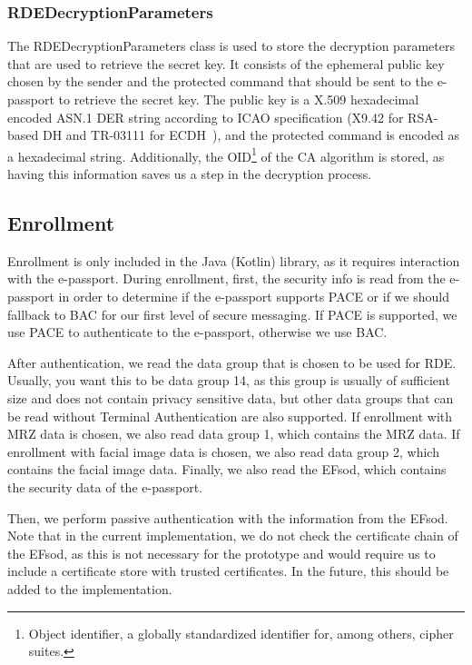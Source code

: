 \subsubsection{\textsf{RDEDecryptionParameters}}\label{subsubsec:rde-decryption-parameters}
The \textsf{RDEDecryptionParameters} class is used to store the decryption parameters that are used to retrieve the secret key.
It consists of the ephemeral public key chosen by the sender and the protected command that should be sent to the e-passport to retrieve the secret key.
The public key is a X.509 hexadecimal encoded ASN.1 DER string according to ICAO specification (X9.42 for RSA-based DH and TR-03111 for ECDH~\cite{icao9303securitymechanisms}), and the protected command is encoded as a hexadecimal string.
Additionally, the OID\footnote{Object identifier, a globally standardized identifier for, among others, cipher suites.} of the CA algorithm is stored, as having this information saves us a step in the decryption process.

\subsection{Enrollment}\label{subsec:enrollment}
Enrollment is only included in the Java (Kotlin) library, as it requires interaction with the e-passport.
During enrollment, first, the security info is read from the e-passport in order to determine if the e-passport supports PACE or if we should fallback to BAC for our first level of secure messaging.
If PACE is supported, we use PACE to authenticate to the e-passport, otherwise we use BAC.

After authentication, we read the data group that is chosen to be used for RDE.
Usually, you want this to be data group 14, as this group is usually of sufficient size and does not contain privacy sensitive data, but other data groups that can be read without Terminal Authentication are also supported.
If enrollment with MRZ data is chosen, we also read data group 1, which contains the MRZ data.
If enrollment with facial image data is chosen, we also read data group 2, which contains the facial image data.
Finally, we also read the EFsod, which contains the security data of the e-passport.

Then, we perform passive authentication with the information from the EFsod.
Note that in the current implementation, we do not check the certificate chain of the EFsod, as this is not necessary for the prototype and would require us to include a certificate store with trusted certificates.
In the future, this should be added to the implementation.

